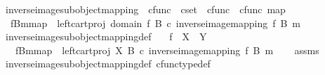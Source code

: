 \begin{isabellebody}
\ inverse{\isacharunderscore}{\kern0pt}image{\isacharunderscore}{\kern0pt}subobject{\isacharunderscore}{\kern0pt}mapping\ {\isacharcolon}{\kern0pt}{\isacharcolon}{\kern0pt}\ {\isachardoublequoteopen}cfunc\ {\isasymRightarrow}\ cset\ {\isasymRightarrow}\ cfunc\ {\isasymRightarrow}\ cfunc{\isachardoublequoteclose}\ {\isacharparenleft}{\kern0pt}{\isachardoublequoteopen}{\isacharbrackleft}{\kern0pt}{\isacharunderscore}{\kern0pt}\isactrlsup {\isacharminus}{\kern0pt}\isactrlbsub {\isacharunderscore}{\kern0pt}\isactrlesub {\isacharbrackright}{\kern0pt}map{\isachardoublequoteclose}\ {\isacharbrackleft}{\kern0pt}{}{}{}{\isacharcomma}{\kern0pt}{}{\isacharcomma}{\kern0pt}{}{\isacharbrackright}{\kern0pt}{}{}{}{\isacharparenright}{\kern0pt}\ \isanewline
\ \ {\isachardoublequoteopen}{\isacharbrackleft}{\kern0pt}f\isactrlsup {\isacharminus}{\kern0pt}B{\isasymrparr}\isactrlbsub m\isactrlesub {\isacharbrackright}{\kern0pt}map\ {\isacharequal}{\kern0pt}\ left{\isacharunderscore}{\kern0pt}cart{\isacharunderscore}{\kern0pt}proj\ {\isacharparenleft}{\kern0pt}domain\ f{\isacharparenright}{\kern0pt}\ B\ {\isasymcirc}\isactrlsub c\ inverse{\isacharunderscore}{\kern0pt}image{\isacharunderscore}{\kern0pt}mapping\ f\ B\ m{\isachardoublequoteclose}\isanewline
\isanewline
{}\isamarkupfalse%
\ inverse{\isacharunderscore}{\kern0pt}image{\isacharunderscore}{\kern0pt}subobject{\isacharunderscore}{\kern0pt}mapping{\isacharunderscore}{\kern0pt}def{}{\isacharcolon}{\kern0pt}\isanewline
\ \ \ {\isachardoublequoteopen}f\ {\isacharcolon}{\kern0pt}\ X\ {\isasymrightarrow}\ Y{\isachardoublequoteclose}\isanewline
\ \ \ {\isachardoublequoteopen}{\isacharbrackleft}{\kern0pt}f\isactrlsup {\isacharminus}{\kern0pt}B{\isasymrparr}\isactrlbsub m\isactrlesub {\isacharbrackright}{\kern0pt}map\ {\isacharequal}{\kern0pt}\ left{\isacharunderscore}{\kern0pt}cart{\isacharunderscore}{\kern0pt}proj\ X\ B\ {\isasymcirc}\isactrlsub c\ inverse{\isacharunderscore}{\kern0pt}image{\isacharunderscore}{\kern0pt}mapping\ f\ B\ m{\isachardoublequoteclose}\isanewline
%
\isadelimproof
\ \ %
\endisadelimproof
%
\isatagproof
{}\isamarkupfalse%
\ assms\ \isamarkupfalse%
\ inverse{\isacharunderscore}{\kern0pt}image{\isacharunderscore}{\kern0pt}subobject{\isacharunderscore}{\kern0pt}mapping{\isacharunderscore}{\kern0pt}def\ cfunc{\isacharunderscore}{\kern0pt}type{\isacharunderscore}{\kern0pt}def\ \isamarkupfalse%

\end{isabellebody}
